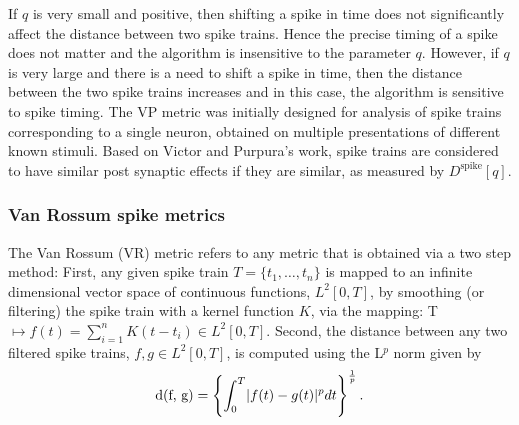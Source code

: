 If $q$ is very small and positive, then shifting a spike in time does not significantly affect the distance between two spike trains. Hence the precise timing of a spike does not matter and the algorithm is insensitive to the parameter $q$.
However, if $q$ is very large and there is  a need to shift a spike in time, then the distance between the two spike trains increases and in this case, the algorithm is sensitive to spike timing. The VP metric was initially designed for analysis of spike trains corresponding to a single neuron, obtained on multiple presentations of different known stimuli. Based on Victor and Purpura's work, spike trains are considered to have similar post synaptic effects if they are similar, as measured by $D^{\text{spike}}[q]$.



\subsubsection{Van Rossum spike metrics}
The Van Rossum (VR) metric \cite{Rossum2001,houghton2010measuring} refers to any metric that is obtained via a two step method:
First, any given spike train $T = \{t_{1}, \ldots, t_{n} \}$ is mapped to an infinite dimensional vector space of continuous functions, $L^{2}[0, T]$, by smoothing (or filtering) the spike train with a kernel function $K$, via the mapping:
T $\displaystyle \mapsto f(t) = \sum_{i=1}^{n} K(t-t_{i}) \in L^{2}[0, T].$
Second, the distance between any two filtered spike trains, $f, g \in L^{2}[0,T]$, is computed using the L$^{p}$ norm given by
\begin{equation}\label{LpNorm}
\text{d(f, g)} = 
\displaystyle \left \{ \int_{0}^{T} \lvert f(t) - g(t)\rvert^{p} dt 
\right \}^{\frac{1}{p}}.
\end{equation}

